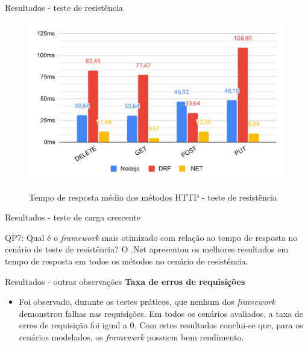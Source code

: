 \documentclass{libs/ufc_format}
\begin{document}
\begin{frame}{Resultados - teste de resistência}
    \begin{figure}[H]
        \centering
        \caption{Tempo de resposta médio dos métodos HTTP - teste de resistência}
        \includegraphics[width=0.9\linewidth]{figuras/resultados/endurance-tempo-metodos-totais3.pdf}
        \captionsetup{justification=centering}
        \label{fig:endurance-tempo-metodos-totais}
    \end{figure}
\end{frame}

\begin{frame}{Resultados - teste de carga crescente}
    \begin{block}{QP7: Qual é o \textit{framework} mais otimizado com relação ao tempo de resposta no cenário de teste de resistência?}
        O .Net apresentou os melhores resultados em tempo de resposta em todos os métodos no cenário de resistência.
    \end{block}
\end{frame}

\begin{frame}{Resultados - outras observações}
    \textbf{Taxa de erros de requisições}
    \begin{itemize}
        \item Foi observado, durante os testes práticos, que nenhum dos \textit{framework} demonstrou falhas nas requisições. Em todos os cenários avaliados, a taxa de erros de requisição foi igual a 0. Com estes resultados conclui-se que, para os cenários modelados, os \textit{framework} possuem bom rendimento.
    \end{itemize}
    
\end{frame}
\end{document}
